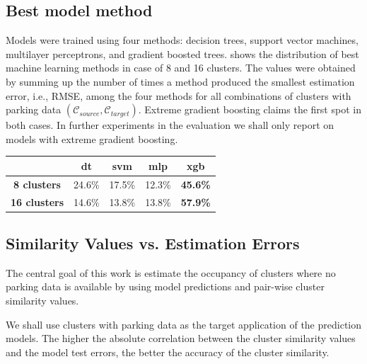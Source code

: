 \documentclass{ws-ijait}
\begin{document}
	\subsection{Best model method}
	Models were trained using four methods: decision trees, support vector machines, multilayer perceptrons, and gradient boosted trees.  shows the distribution of best machine learning methods in case of 8 and 16 clusters.
	The values were obtained by summing up the number of times a method produced the smallest estimation error, i.e., RMSE, among the four methods for all combinations of clusters with parking data $(\mathcal{C}_{source}, \mathcal{C}_{target})$.
	Extreme gradient boosting claims the first spot in both cases.
	In further experiments in the evaluation we shall only report on models with extreme gradient boosting.
	
	\begin{table}[!ht]
		{\begin{tabular}{ | c | c | c | c | c |}
				\hline
				& \textbf{dt} & \textbf{svm} & \textbf{mlp} & \textbf{xgb} \\ \hline
				\textbf{8 clusters} & 24.6\% & 17.5\% & 12.3\% & \textbf{45.6\%} \\ \hline
				\textbf{16 clusters} & 14.6\% & 13.8\% & 13.8\% & \textbf{57.9\%} \\ \hline
		\end{tabular}}
		\label{evaluation:best_model_method}
	\end{table}
	
	\subsection{Similarity Values vs. Estimation Errors}
	The central goal of this work is estimate the occupancy of clusters where no parking data is available by using model predictions and pair-wise cluster similarity values. 
	
	 
	We shall use clusters with parking data as the target application of the prediction models. 
	The higher the absolute correlation between the cluster similarity values and the model test errors, the better the accuracy of the cluster similarity. 
	
\end{document}
